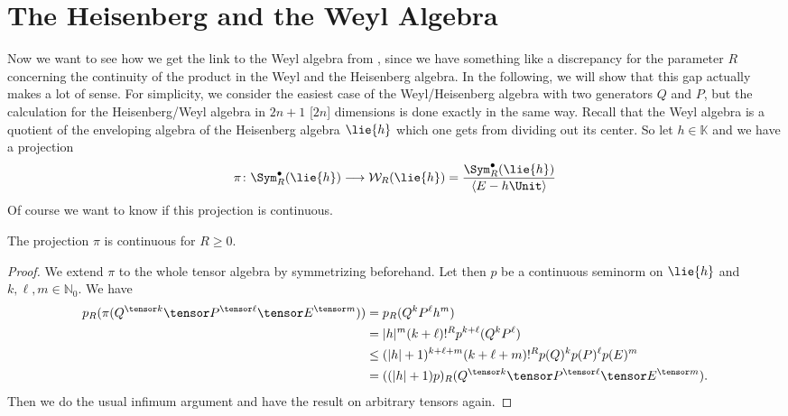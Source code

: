 \section{The Heisenberg and the Weyl Algebra}
\label{sec:chap6_HeisenbergWeyl}

Now we want to see how we get the link to the Weyl algebra from
\cite{waldmann:2014a}, since we have something like a discrepancy for the
parameter $R$ concerning the continuity of the product in the Weyl and the 
Heisenberg algebra. In the following, we will show that this gap actually makes 
a lot of sense. For simplicity, we consider the easiest case of
the Weyl/Heisenberg algebra with two generators $Q$ and $P$, but the 
calculation for the Heisenberg/Weyl algebra in $2n + 1$ [$2n$] dimensions 
is done exactly in the same way.
Recall that the Weyl algebra is a quotient of the enveloping algebra of the 
Heisenberg algebra $\lie{h}$ which one gets from dividing out its center. So 
let $h \in \mathbb{K}$ and we have a projection
\begin{equation}
    \label{Nilpot:WeylProjection}
    \pi \colon
    \Sym_R^\bullet(\lie{h})
    \longrightarrow
    \mathcal{W}_R(\lie{h})
    =
    \frac{\Sym_R^\bullet(\lie{h})}
    {\langle E - h \Unit \rangle}
\end{equation}
Of course we want to know if this projection is continuous.
\begin{proposition}
    \label{proposition:ProjectionWeylContinuous}%
    The projection $\pi$ is continuous for $R \geq 0$.
\end{proposition}
\begin{proof}
    We extend $\pi$ to the whole tensor algebra by symmetrizing beforehand. Let 
    then $p$ be a continuous seminorm on $\lie{h}$ and $k, \ell, m \in 
    \mathbb{N}_0$. We have
    \begin{align*}
        p_R(\pi (
        	Q^{\tensor k} \tensor
        	P^{\tensor \ell} \tensor
        	E^{\tensor m}
        ) )
        & =
        p_R( Q^k P^{\ell} h^m )
        \\
        & =
        |h|^m (k + \ell)!^R
        p^{k + \ell}(Q^k P^{\ell})
        \\
        & \leq
        (|h| + 1)^{k + \ell + m}
        (k + \ell + m)!^R
        p(Q)^k p(P)^{\ell} p(E)^m
        \\
        & =
        ((|h| + 1) p)_R
        (Q^{\tensor k} \tensor
        P^{\tensor \ell} \tensor
        E^{\tensor m}).
    \end{align*}
    Then we do the usual infimum argument and have the result on
    arbitrary tensors again.
\end{proof}


